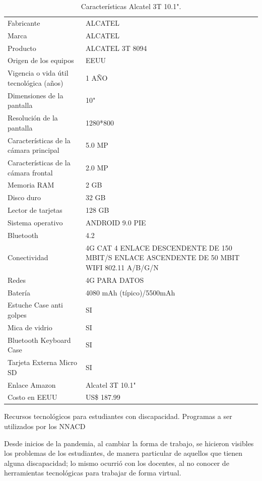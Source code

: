 \documentclass[spanish]{textolivre}
\begin{document}
\begin{table}[h!]
\centering
\begin{threeparttable}
\caption{Características Alcatel 3T 10.1".}
\label{tab04}
\centering
\begin{tabular}{p{} p{}}
\toprule
Fabricante & ALCATEL \\
Marca & ALCATEL \\
Producto & ALCATEL 3T 8094  \\
Origen de los equipos & EEUU \\
Vigencia o vida útil tecnológica (años) & 1 AÑO \\
Dimensiones de la pantalla & 10" \\
Resolución de la pantalla & 1280*800 \\
Características de la cámara principal & 5.0 MP \\
Características de la cámara frontal & 2.0 MP \\
Memoria RAM & 2 GB \\
Disco duro & 32 GB \\
Lector de tarjetas & 128 GB \\
Sistema operativo & ANDROID 9.0 PIE \\
Bluetooth & 4.2 \\
Conectividad & 4G CAT 4 ENLACE DESCENDENTE DE 150 MBIT/S ENLACE ASCENDENTE DE 50 MBIT WIFI 802.11 A/B/G/N \\
Redes & 4G PARA DATOS \\
Batería & 4080 mAh (típico)/5500mAh \\
Estuche Case anti golpes  & SI \\
Mica de vidrio & SI \\
Bluetooth Keyboard Case & SI \\
Tarjeta Externa Micro SD  & SI \\
Enlace Amazon & Alcatel 3T 10.1" \\
Costo en EEUU & US\$ 187.99 \\
\bottomrule
\end{tabular}
\end{threeparttable}
\end{table}

Recursos tecnológicos para estudiantes con discapacidad. Programas a ser utilizados por los NNACD

Desde inicios de la pandemia, al cambiar la forma de trabajo, se hicieron visibles los problemas de los estudiantes, de manera particular de aquellos que tienen alguna discapacidad; lo mismo ocurrió con los docentes, al no conocer de herramientas tecnológicas para trabajar de forma virtual.
\end{document}
